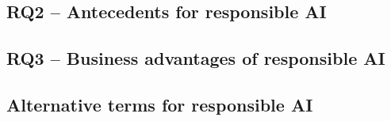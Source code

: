\subsection{RQ2 -- Antecedents for responsible AI}

\subsection{RQ3 -- Business advantages of responsible AI}


\subsection{Alternative terms for responsible AI}
\label{sec:results-alernative-terms}


